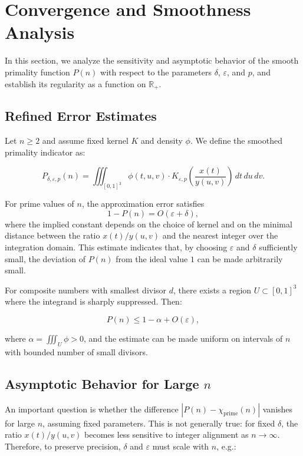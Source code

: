 \documentclass[12pt]{article}
\theoremstyle{definition}
\theoremstyle{plain}
\theoremstyle{remark}
\begin{document}
\section{Convergence and Smoothness Analysis}

In this section, we analyze the sensitivity and asymptotic behavior of the smooth primality function \( P(n) \) with respect to the parameters \( \delta \), \( \varepsilon \), and \( p \), and establish its regularity as a function on \( \mathbb{R}_+ \).

\subsection{Refined Error Estimates}

Let \( n \geq 2 \) and assume fixed kernel \( K \) and density \( \phi \). We define the smoothed primality indicator as:

\[
P_{\delta, \varepsilon, p}(n) = \iiint_{[0,1]^3} \phi(t,u,v) \cdot K_{\varepsilon, p}\left( \frac{x(t)}{y(u,v)} \right) \, dt \, du \, dv.
\]

For prime values of \( n \), the approximation error satisfies
\[
1 - P(n) = O(\varepsilon + \delta),
\]
where the implied constant depends on the choice of kernel and on the minimal distance between the ratio \( x(t)/y(u,v) \) and the nearest integer over the integration domain. This estimate indicates that, by choosing \( \varepsilon \) and \( \delta \) sufficiently small, the deviation of \( P(n) \) from the ideal value \( 1 \) can be made arbitrarily small.

For composite numbers with smallest divisor \( d \), there exists a region \( U \subset [0,1]^3 \) where the integrand is sharply suppressed. Then:

\[
P(n) \leq 1 - \alpha + O(\varepsilon),
\]

where \( \alpha = \iiint_U \phi > 0 \), and the estimate can be made uniform on intervals of \( n \) with bounded number of small divisors.

\subsection{Asymptotic Behavior for Large \texorpdfstring{\( n \)}{n}}

An important question is whether the difference \( |P(n) - \chi_{\mathrm{prime}}(n)| \) vanishes for large \( n \), assuming fixed parameters. This is not generally true: for fixed \( \delta \), the ratio \( x(t)/y(u,v) \) becomes less sensitive to integer alignment as \( n \to \infty \). Therefore, to preserve precision, \( \delta \) and \( \varepsilon \) must scale with \( n \), e.g.:
\end{document}
